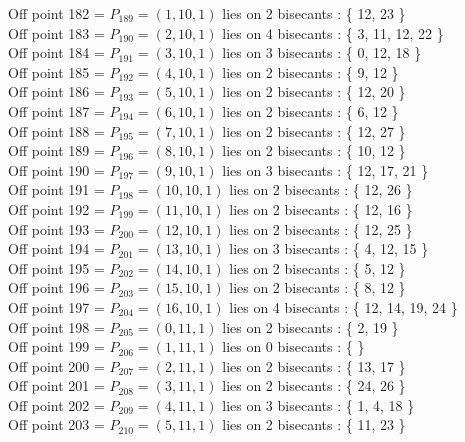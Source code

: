 \documentclass{article}
\begin{document}
{Off point 182 = $P_{189} = ( 1, 10, 1 )$ lies on 2 bisecants : \{ 12, 23 \}\\
Off point 183 = $P_{190} = ( 2, 10, 1 )$ lies on 4 bisecants : \{ 3, 11, 12, 22 \}\\
Off point 184 = $P_{191} = ( 3, 10, 1 )$ lies on 3 bisecants : \{ 0, 12, 18 \}\\
Off point 185 = $P_{192} = ( 4, 10, 1 )$ lies on 2 bisecants : \{ 9, 12 \}\\
Off point 186 = $P_{193} = ( 5, 10, 1 )$ lies on 2 bisecants : \{ 12, 20 \}\\
Off point 187 = $P_{194} = ( 6, 10, 1 )$ lies on 2 bisecants : \{ 6, 12 \}\\
Off point 188 = $P_{195} = ( 7, 10, 1 )$ lies on 2 bisecants : \{ 12, 27 \}\\
Off point 189 = $P_{196} = ( 8, 10, 1 )$ lies on 2 bisecants : \{ 10, 12 \}\\
Off point 190 = $P_{197} = ( 9, 10, 1 )$ lies on 3 bisecants : \{ 12, 17, 21 \}\\
Off point 191 = $P_{198} = ( 10, 10, 1 )$ lies on 2 bisecants : \{ 12, 26 \}\\
Off point 192 = $P_{199} = ( 11, 10, 1 )$ lies on 2 bisecants : \{ 12, 16 \}\\
Off point 193 = $P_{200} = ( 12, 10, 1 )$ lies on 2 bisecants : \{ 12, 25 \}\\
Off point 194 = $P_{201} = ( 13, 10, 1 )$ lies on 3 bisecants : \{ 4, 12, 15 \}\\
Off point 195 = $P_{202} = ( 14, 10, 1 )$ lies on 2 bisecants : \{ 5, 12 \}\\
Off point 196 = $P_{203} = ( 15, 10, 1 )$ lies on 2 bisecants : \{ 8, 12 \}\\
Off point 197 = $P_{204} = ( 16, 10, 1 )$ lies on 4 bisecants : \{ 12, 14, 19, 24 \}\\
Off point 198 = $P_{205} = ( 0, 11, 1 )$ lies on 2 bisecants : \{ 2, 19 \}\\
Off point 199 = $P_{206} = ( 1, 11, 1 )$ lies on 0 bisecants : \{  \}\\
Off point 200 = $P_{207} = ( 2, 11, 1 )$ lies on 2 bisecants : \{ 13, 17 \}\\
Off point 201 = $P_{208} = ( 3, 11, 1 )$ lies on 2 bisecants : \{ 24, 26 \}\\
Off point 202 = $P_{209} = ( 4, 11, 1 )$ lies on 3 bisecants : \{ 1, 4, 18 \}\\
Off point 203 = $P_{210} = ( 5, 11, 1 )$ lies on 2 bisecants : \{ 11, 23 \}\\
}
\end{document}
